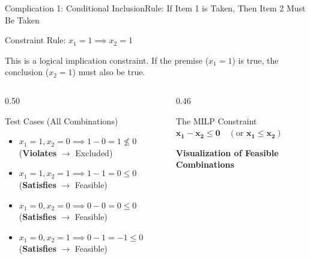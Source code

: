 \documentclass[aspectratio=169]{beamer}
\newenvironment{constraintblock}[1]{
    \begin{block}{Constraint Rule: #1}
    \vspace{-0.3em}
}{
    \end{block}
}
\begin{document}
\begin{frame}{Complication 1: Conditional Inclusion}{Rule: If Item 1 is Taken, Then Item 2 Must Be Taken}
    \begin{constraintblock}{$x_1 = 1 \implies x_2 = 1$}
        This is a logical implication constraint. If the premise ($x_1=1$) is true, the conclusion ($x_2=1$) must also be true.
    \end{constraintblock}

    \begin{columns}[T]
        \begin{column}{0.50\textwidth}
            \begin{alertblock}{Test Cases (All Combinations)}
            \footnotesize
                \begin{itemize}
                    \item $x_1=1, x_2=0 \implies 1-0 = 1 \not\le 0$ (\textbf{Violates} $\rightarrow$ \alert{Excluded})
                    \item $x_1=1, x_2=1 \implies 1-1 = 0 \le 0$ (\textbf{Satisfies} $\rightarrow$ Feasible)
                    \item $x_1=0, x_2=0 \implies 0-0 = 0 \le 0$ (\textbf{Satisfies} $\rightarrow$ Feasible)
                    \item $x_1=0, x_2=1 \implies 0-1 = -1 \le 0$ (\textbf{Satisfies} $\rightarrow$ Feasible)
                \end{itemize}
            \end{alertblock}
        \end{column}
        \begin{column}{0.46\textwidth}
            \begin{block}{The MILP Constraint}
                \centering $\mathbf{x_1 - x_2 \le 0} \quad (\text{or } \mathbf{x_1 \le x_2})$
            \end{block}
            \centering
            \footnotesize \textbf{Visualization of Feasible Combinations}\\[2pt]
\end{column}
\end{columns}
\end{frame}
\end{document}
